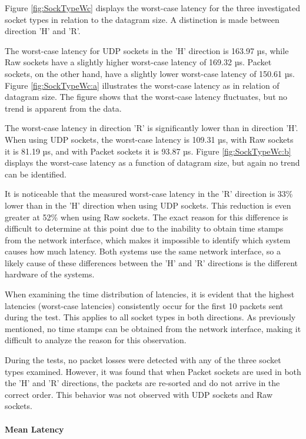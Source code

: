 Figure \ref{fig:SockTypeWc} displays the worst-case latency for the three investigated socket types in relation to the datagram size. A distinction is made between direction 'H' and 'R'.

The worst-case latency for UDP sockets in the 'H' direction is 163.97 µs, while Raw sockets have a slightly higher worst-case latency of 169.32 µs. Packet sockets, on the other hand, have a slightly lower worst-case latency of 150.61 µs. Figure \ref{fig:SockTypeWc:a} illustrates the worst-case latency as in relation of datagram size. The figure shows that the worst-case latency fluctuates, but no trend is apparent from the data.

The worst-case latency in direction 'R' is significantly lower than in direction 'H'. When using UDP sockets, the worst-case latency is 109.31 µs, with Raw sockets it is 81.19 µs, and with Packet sockets it is 93.87 µs. Figure \ref{fig:SockTypeWc:b} displays the worst-case latency as a function of datagram size, but again no trend can be identified.

It is noticeable that the measured worst-case latency in the 'R' direction is 33\% lower than in the 'H' direction when using UDP sockets. This reduction is even greater at 52\% when using Raw sockets. The exact reason for this difference is difficult to determine at this point due to the inability to obtain time stamps from the network interface, which makes it impossible to identify which system causes how much latency. Both systems use the same network interface, so a likely cause of these differences between the 'H' and 'R' directions is the different hardware of the systems.

When examining the time distribution of latencies, it is evident that the highest latencies (worst-case latencies) consistently occur for the first 10 packets sent during the test. This applies to all socket types in both directions. As previously mentioned, no time stamps can be obtained from the network interface, making it difficult to analyze the reason for this observation.

During the tests, no packet losses were detected with any of the three socket types examined. However, it was found that when Packet sockets are used in both the 'H' and 'R' directions, the packets are re-sorted and do not arrive in the correct order. This behavior was not observed with UDP sockets and Raw sockets.

\paragraph{Mean Latency}

